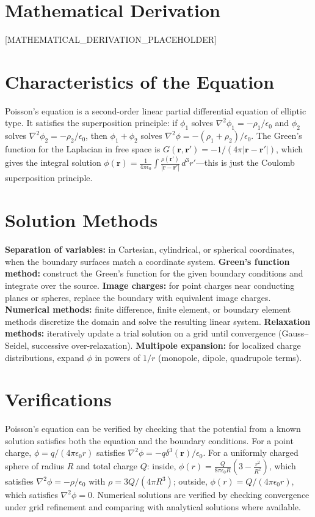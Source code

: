 \documentclass[11pt,openright]{book}
\begin{document}
\section*{Mathematical Derivation}

[MATHEMATICAL_DERIVATION_PLACEHOLDER]

\section*{Characteristics of the Equation}

Poisson's equation is a second-order linear partial differential equation of elliptic type. It satisfies the superposition principle: if $\phi_1$ solves $\nabla^2\phi_1 = -\rho_1/\epsilon_0$ and $\phi_2$ solves $\nabla^2\phi_2 = -\rho_2/\epsilon_0$, then $\phi_1 + \phi_2$ solves $\nabla^2\phi = -(\rho_1 + \rho_2)/\epsilon_0$. The Green's function for the Laplacian in free space is $G(\mathbf{r}, \mathbf{r}') = -1/(4\pi|\mathbf{r} - \mathbf{r}'|)$, which gives the integral solution $\phi(\mathbf{r}) = \frac{1}{4\pi\epsilon_0}\int\frac{\rho(\mathbf{r}')}{|\mathbf{r} - \mathbf{r}'|}\,d^3r'$---this is just the Coulomb superposition principle.
\section*{Solution Methods}

\textbf{Separation of variables:} in Cartesian, cylindrical, or spherical coordinates, when the boundary surfaces match a coordinate system. \textbf{Green's function method:} construct the Green's function for the given boundary conditions and integrate over the source. \textbf{Image charges:} for point charges near conducting planes or spheres, replace the boundary with equivalent image charges. \textbf{Numerical methods:} finite difference, finite element, or boundary element methods discretize the domain and solve the resulting linear system. \textbf{Relaxation methods:} iteratively update a trial solution on a grid until convergence (Gauss--Seidel, successive over-relaxation). \textbf{Multipole expansion:} for localized charge distributions, expand $\phi$ in powers of $1/r$ (monopole, dipole, quadrupole terms).
\section*{Verifications}

Poisson's equation can be verified by checking that the potential from a known solution satisfies both the equation and the boundary conditions. For a point charge, $\phi = q/(4\pi\epsilon_0 r)$ satisfies $\nabla^2\phi = -q\delta^3(\mathbf{r})/\epsilon_0$. For a uniformly charged sphere of radius $R$ and total charge $Q$: inside, $\phi(r) = \frac{Q}{8\pi\epsilon_0 R}\left(3 - \frac{r^2}{R^2}\right)$, which satisfies $\nabla^2\phi = -\rho/\epsilon_0$ with $\rho = 3Q/(4\pi R^3)$; outside, $\phi(r) = Q/(4\pi\epsilon_0 r)$, which satisfies $\nabla^2\phi = 0$. Numerical solutions are verified by checking convergence under grid refinement and comparing with analytical solutions where available.
\end{document}
